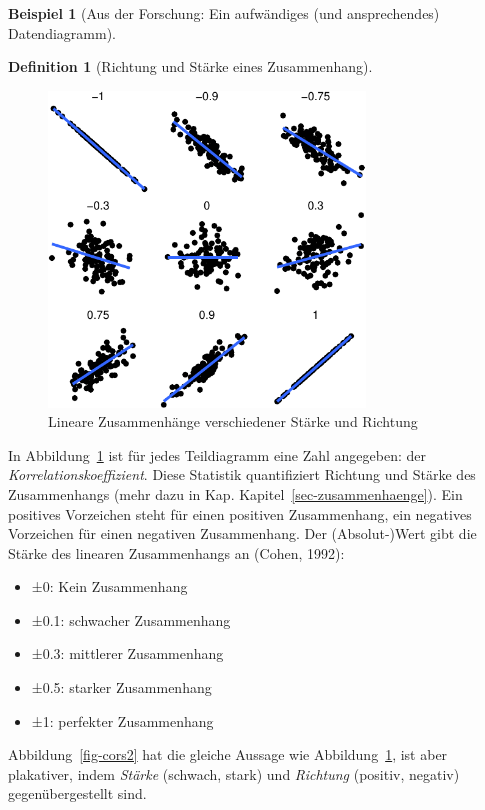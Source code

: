 \documentclass[
  a4paper,
]{scrbook}
\providecommand{\tightlist}{%
  \setlength{\itemsep}{0pt}\setlength{\parskip}{0pt}}\usepackage{longtable,booktabs,array}
\theoremstyle{definition}
\newtheorem{example}{Beispiel}[chapter]
\theoremstyle{definition}
\newtheorem{definition}{Definition}[chapter]
\theoremstyle{definition}
\theoremstyle{remark}
\begin{document}
\begin{example}[Aus der Forschung: Ein aufwändiges (und ansprechendes)
Datendiagramm]
\begin{definition}[Richtung und Stärke eines
Zusammenhang]
\begin{figure}
{\includegraphics[width=0.75\textwidth,height=\textheight]{040-verbildlichen_files/figure-pdf/fig-cors-1.pdf}

}

\caption{\label{fig-cors}Lineare Zusammenhänge verschiedener Stärke und
Richtung}

\end{figure}%

In Abbildung~\ref{fig-cors} ist für jedes Teildiagramm eine Zahl
angegeben: der \emph{Korrelationskoeffizient}. Diese Statistik
quantifiziert Richtung und Stärke des Zusammenhangs (mehr dazu in Kap.
Kapitel~\ref{sec-zusammenhaenge}). Ein positives Vorzeichen steht für
einen positiven Zusammenhang, ein negatives Vorzeichen für einen
negativen Zusammenhang. Der (Absolut-)Wert gibt die Stärke des linearen
Zusammenhangs an (Cohen, 1992):

\begin{itemize}
\tightlist
\item
  ±0: Kein Zusammenhang
\item
  ±0.1: schwacher Zusammenhang
\item
  ±0.3: mittlerer Zusammenhang
\item
  ±0.5: starker Zusammenhang
\item
  ±1: perfekter Zusammenhang
\end{itemize}

Abbildung~\ref{fig-cors2} hat die gleiche Aussage wie
Abbildung~\ref{fig-cors}, ist aber plakativer, indem \emph{Stärke}
(schwach, stark) und \emph{Richtung} (positiv, negativ)
gegenübergestellt sind.

\begin{figure}


\end{figure}
\end{definition}
\end{example}
\end{document}
